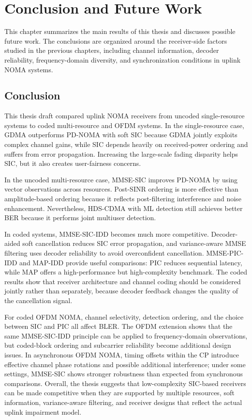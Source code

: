 \chapter{Conclusion and Future Work}\label{ch:conclusion}

This chapter summarizes the main results of this thesis and discusses possible future work. The conclusions are organized around the receiver-side factors studied in the previous chapters, including channel information, decoder reliability, frequency-domain diversity, and synchronization conditions in uplink NOMA systems.

\section{Conclusion}

This thesis draft compared uplink NOMA receivers from uncoded single-resource systems to coded multi-resource and OFDM systems. In the single-resource case, GDMA outperforms PD-NOMA with soft SIC because GDMA jointly exploits complex channel gains, while SIC depends heavily on received-power ordering and suffers from error propagation. Increasing the large-scale fading disparity helps SIC, but it also creates user-fairness concerns.

In the uncoded multi-resource case, MMSE-SIC improves PD-NOMA by using vector observations across resources. Post-SINR ordering is more effective than amplitude-based ordering because it reflects post-filtering interference and noise enhancement. Nevertheless, HDS-CDMA with ML detection still achieves better BER because it performs joint multiuser detection.

In coded systems, MMSE-SIC-IDD becomes much more competitive. Decoder-aided soft cancellation reduces SIC error propagation, and variance-aware MMSE filtering uses decoder reliability to avoid overconfident cancellation. MMSE-PIC-IDD and MAP-IDD provide useful comparisons: PIC reduces sequential latency, while MAP offers a high-performance but high-complexity benchmark. The coded results show that receiver architecture and channel coding should be considered jointly rather than separately, because decoder feedback changes the quality of the cancellation signal.

For coded OFDM NOMA, channel selectivity, detection ordering, and the choice between SIC and PIC all affect BLER. The OFDM extension shows that the same MMSE-SIC-IDD principle can be applied to frequency-domain observations, but coded-block ordering and subcarrier reliability become additional design issues. In asynchronous OFDM NOMA, timing offsets within the CP introduce effective channel phase rotations and possible additional interference; under some settings, MMSE-SIC shows stronger robustness than expected from synchronous comparisons. Overall, the thesis suggests that low-complexity SIC-based receivers can be made competitive when they are supported by multiple resources, soft information, variance-aware filtering, and receiver designs that reflect the actual uplink impairment model.

